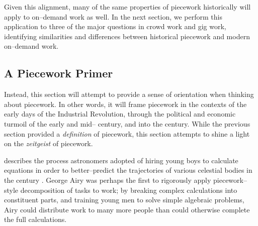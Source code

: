 \documentclass[trackingWork]{subfiles}
\begin{document}
Given this alignment, many of the same properties of piecework historically will apply to on--demand work as well. In the next section, we perform this application to three of the major questions in crowd work and gig work, identifying similarities and differences between historical piecework and modern on--demand work.





\subsection{A Piecework Primer}\label{sec:pieceworkPrimer} %
Instead, this section will attempt to provide a sense of orientation when thinking about piecework.
In other words, it will frame piecework in the contexts of
the early days of the Industrial Revolution,
through the political and economic turmoil of the early and mid-- century,
and into the  century.
While the previous section provided a \textit{definition} of piecework,
this section attempts to shine a light on the \textit{zeitgeist} of piecework.


\citeauthor{grier2013computers} describes the process astronomers adopted of hiring young boys
to calculate equations in order
to better--predict the trajectories of various celestial bodies in the  century
\cite{grier2013computers}.
George Airy was perhaps the first to rigorously apply piecework--style decomposition of tasks to work;
by breaking complex calculations into constituent parts, and
training young men to solve simple algebraic problems,
Airy could distribute work to many more people than could otherwise complete the full calculations.

\end{document}
